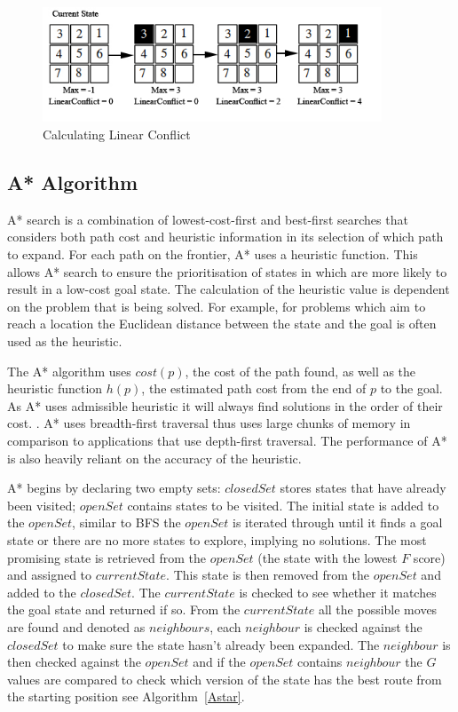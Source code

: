 \documentclass[final]{cmpreport}
\begin{document}
\begin{figure}[ht]
	\centering
	\includegraphics[width=0.9\textwidth]{linear}
	\captionsetup{justification=centering}
	\caption{Calculating Linear Conflict}
\end{figure}



\subsection{A* Algorithm}
A* search is a combination of lowest-cost-first and best-first searches that considers both path cost and heuristic information in its selection of which path to expand. For each path on the frontier, A* uses a heuristic function. This allows A* search to ensure the prioritisation of states in which are more likely to result in a low-cost goal state. The calculation of the heuristic value is dependent on the problem that is being solved. For example, for problems which aim to reach a location the Euclidean distance between the state and the goal is often used as the heuristic. 

The A* algorithm uses $cost(p)$, the cost of the path found, as well as the heuristic function $h(p)$, the estimated path cost from the end of $p$ to the goal. As A* uses admissible heuristic it will always find solutions in the order of their cost. \citep{DBLP:journals/ker/Brewka96}.  A* uses breadth-first traversal thus uses large chunks of memory in comparison to applications that use depth-first traversal. The performance of A* is also heavily reliant on the accuracy of the heuristic.

A* begins by declaring two empty sets: $closedSet$ stores states that have already been visited; $openSet$ contains states to be visited. The initial state is added to the $openSet$, similar to BFS the $openSet$ is iterated through until it finds a goal state or there are no more states to explore, implying no solutions. The most promising state is retrieved from the $openSet$ (the state with the lowest $F$ score) and assigned to $currentState$. This state is then removed from the $openSet$ and added to the $closedSet$. The $currentState$ is checked to see whether it matches the goal state and returned if so. From the $currentState$ all the possible moves are found and denoted as $neighbours$, each $neighbour$ is checked against the $closedSet$ to make sure the state hasn't already been expanded. The $neighbour$ is then checked against the $openSet$ and if the $openSet$ contains $neighbour$ the $G$ values are compared to check which version of the state has the best route from the starting position see Algorithm~\ref{Astar}.
\end{document}

